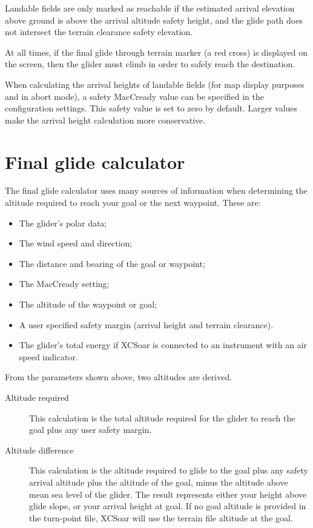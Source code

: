 Landable fields are only marked as reachable if the estimated arrival
elevation above ground is above the arrival altitude safety height,
and the glide path does not intersect the terrain clearance safety
elevation.

At all times, if the final glide through terrain marker (a red
cross) is displayed on the screen, then the glider must climb in order
to safely reach the destination.

When calculating the arrival heights of landable fields (for map
display purposes and in abort mode), a safety MacCready value can be
specified in the configuration settings.  This safety value is set to
zero by default.  Larger values make the arrival height calculation
more conservative.


\section{Final glide calculator}

The final glide calculator uses many sources of information when
determining the altitude required to reach your goal or the next
waypoint. These are:

\begin{itemize}
\item The glider's polar data;
\item The wind speed and direction;
\item The distance and bearing of the goal or waypoint;
\item The MacCready setting;
\item The altitude of the waypoint or goal;
\item A user specified safety margin (arrival height and terrain clearance).
\item The glider's total energy if XCSoar is connected to
  an instrument with an air speed indicator.
\end{itemize}

From the parameters shown above, two altitudes are derived.
\begin{description}
\item[Altitude required]
This calculation is the total altitude required for the glider to
reach the goal plus any user safety margin. 
\item[Altitude difference]
This calculation is the altitude required to glide to the goal plus
any safety arrival altitude plus the altitude of the goal, minus the
altitude above mean sea level of the glider.  The result represents
either your height above glide slope, or your arrival height at goal.
If no goal altitude is provided in the turn-point file, XCSoar will use
the terrain file altitude at the goal.
\end{description}

